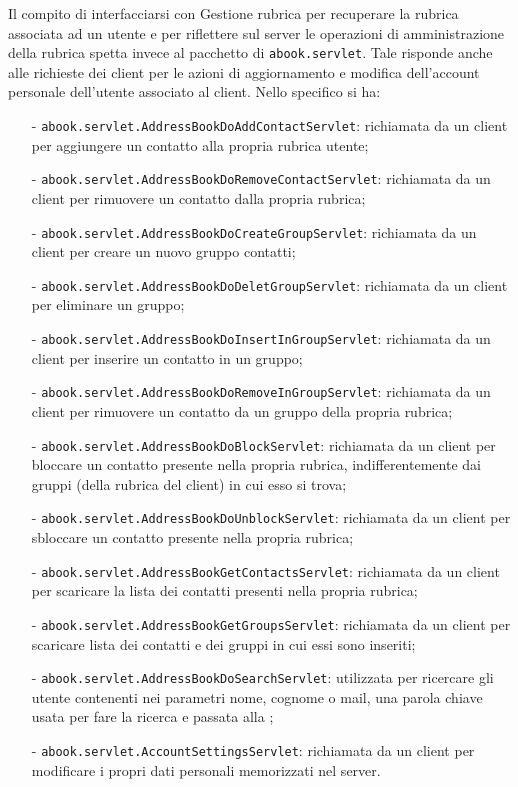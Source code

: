 \begin{description}
Il compito di interfacciarsi con \textsf{Gestione rubrica} per recuperare la rubrica associata ad un utente e per riflettere sul server le operazioni di amministrazione della rubrica spetta invece al pacchetto di  \texttt{abook.servlet}. Tale  risponde anche alle richieste dei client per le azioni di aggiornamento e modifica dell'account personale dell'utente associato al client. Nello specifico si ha:

\begin{itemize}
	  \item[-] \texttt{abook.servlet.AddressBookDoAddContactServlet}: richiamata da un client per aggiungere un contatto alla propria rubrica utente;
	  \item[-] \texttt{abook.servlet.AddressBookDoRemoveContactServlet}: richiamata da un client per rimuovere un contatto dalla propria rubrica;
	  \item[-] \texttt{abook.servlet.AddressBookDoCreateGroupServlet}: richiamata da un client per creare un nuovo gruppo contatti;
	  \item[-] \texttt{abook.servlet.AddressBookDoDeletGroupServlet}: richiamata da un client per eliminare un gruppo;
	  \item[-] \texttt{abook.servlet.AddressBookDoInsertInGroupServlet}: richiamata da un client per inserire un contatto in un gruppo;
	  \item[-] \texttt{abook.servlet.AddressBookDoRemoveInGroupServlet}: richiamata da un client per rimuovere un contatto da un gruppo della propria rubrica;
	  \item[-] \texttt{abook.servlet.AddressBookDoBlockServlet}: richiamata da un client per bloccare un contatto presente nella propria rubrica, indifferentemente dai gruppi (della rubrica del client) in cui esso si trova;
	  \item[-] \texttt{abook.servlet.AddressBookDoUnblockServlet}: richiamata da un client per sbloccare un contatto presente nella propria rubrica;
	  \item[-] \texttt{abook.servlet.AddressBookGetContactsServlet}: richiamata da un client per scaricare la lista dei contatti presenti nella propria rubrica;
	  \item[-] \texttt{abook.servlet.AddressBookGetGroupsServlet}: richiamata da un client per scaricare lista dei contatti e dei gruppi in cui essi sono inseriti;
	  \item[-] \texttt{abook.servlet.AddressBookDoSearchServlet}: utilizzata per ricercare gli utente contenenti nei parametri nome, cognome o mail, una parola chiave usata per fare la ricerca e passata alla ;
	  \item[-] \texttt{abook.servlet.AccountSettingsServlet}: richiamata da un client per modificare i propri dati personali memorizzati nel server.
\end{itemize}


\end{description}
